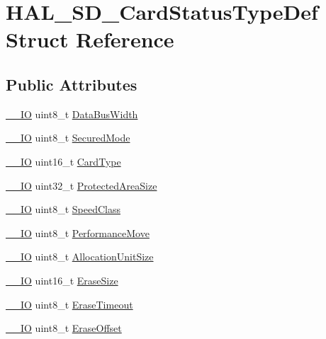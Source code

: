 \hypertarget{struct_h_a_l___s_d___card_status_type_def}{}\section{H\+A\+L\+\_\+\+S\+D\+\_\+\+Card\+Status\+Type\+Def Struct Reference}
\label{struct_h_a_l___s_d___card_status_type_def}
\subsection*{Public Attributes}
\begin{DoxyCompactItemize}
\item 
\mbox{\hyperlink{core__sc300_8h_aec43007d9998a0a0e01faede4133d6be}{\+\_\+\+\_\+\+IO}} uint8\+\_\+t \mbox{\hyperlink{struct_h_a_l___s_d___card_status_type_def_aa7ddfdfe115aec01c17a004d1dc82581}{Data\+Bus\+Width}}
\item 
\mbox{\hyperlink{core__sc300_8h_aec43007d9998a0a0e01faede4133d6be}{\+\_\+\+\_\+\+IO}} uint8\+\_\+t \mbox{\hyperlink{struct_h_a_l___s_d___card_status_type_def_adc5651f507f7706968b93e7aedac8a35}{Secured\+Mode}}
\item 
\mbox{\hyperlink{core__sc300_8h_aec43007d9998a0a0e01faede4133d6be}{\+\_\+\+\_\+\+IO}} uint16\+\_\+t \mbox{\hyperlink{struct_h_a_l___s_d___card_status_type_def_a4a00ab7d42c93608ec407d3c28b50eec}{Card\+Type}}
\item 
\mbox{\hyperlink{core__sc300_8h_aec43007d9998a0a0e01faede4133d6be}{\+\_\+\+\_\+\+IO}} uint32\+\_\+t \mbox{\hyperlink{struct_h_a_l___s_d___card_status_type_def_aebd64bdfc1886b81784ded596a05a026}{Protected\+Area\+Size}}
\item 
\mbox{\hyperlink{core__sc300_8h_aec43007d9998a0a0e01faede4133d6be}{\+\_\+\+\_\+\+IO}} uint8\+\_\+t \mbox{\hyperlink{struct_h_a_l___s_d___card_status_type_def_a1f0e2b9742c588e099113d378303c781}{Speed\+Class}}
\item 
\mbox{\hyperlink{core__sc300_8h_aec43007d9998a0a0e01faede4133d6be}{\+\_\+\+\_\+\+IO}} uint8\+\_\+t \mbox{\hyperlink{struct_h_a_l___s_d___card_status_type_def_a6b56a149d1b77355c082ed12df448ed9}{Performance\+Move}}
\item 
\mbox{\hyperlink{core__sc300_8h_aec43007d9998a0a0e01faede4133d6be}{\+\_\+\+\_\+\+IO}} uint8\+\_\+t \mbox{\hyperlink{struct_h_a_l___s_d___card_status_type_def_af2471ecda3806f6e24c779866593b697}{Allocation\+Unit\+Size}}
\item 
\mbox{\hyperlink{core__sc300_8h_aec43007d9998a0a0e01faede4133d6be}{\+\_\+\+\_\+\+IO}} uint16\+\_\+t \mbox{\hyperlink{struct_h_a_l___s_d___card_status_type_def_af242d966324e5f943fda4867cdb985c2}{Erase\+Size}}
\item 
\mbox{\hyperlink{core__sc300_8h_aec43007d9998a0a0e01faede4133d6be}{\+\_\+\+\_\+\+IO}} uint8\+\_\+t \mbox{\hyperlink{struct_h_a_l___s_d___card_status_type_def_a95cb103cd0ee7578f84320e95e9346a1}{Erase\+Timeout}}
\item 
\mbox{\hyperlink{core__sc300_8h_aec43007d9998a0a0e01faede4133d6be}{\+\_\+\+\_\+\+IO}} uint8\+\_\+t \mbox{\hyperlink{struct_h_a_l___s_d___card_status_type_def_ad0a92dbb57cdbaca75745277bed72552}{Erase\+Offset}}
\end{DoxyCompactItemize}


